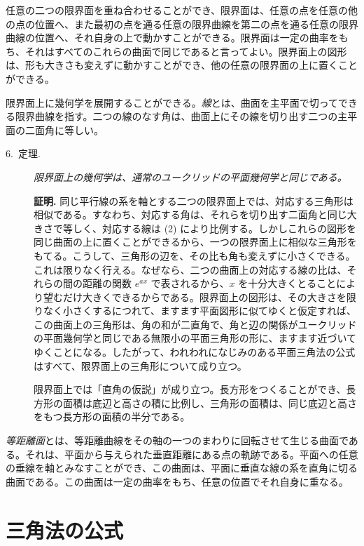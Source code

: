 任意の二つの限界面を重ね合わせることができ、限界面は、任意の点を任意の他の点の位置へ、また最初の点を通る任意の限界曲線を第二の点を通る任意の限界曲線の位置へ、それ自身の上で動かすことができる。限界面は一定の曲率をもち、それはすべてのこれらの曲面で同じであると言ってよい。限界面上の図形は、形も大きさも変えずに動かすことができ、他の任意の限界面の上に置くことができる。

限界面上に幾何学を展開することができる。\emph{線}とは、曲面を主平面で切ってできる限界曲線を指す。二つの線のなす角は、曲面上にその線を切り出す二つの主平面の二面角に等しい。

\begin{description}
\item[6.~定理.] \emph{限界面上の幾何学は、通常のユークリッドの平面幾何学と同じである。}

\textbf{証明.} 同じ平行線の系を軸とする二つの限界面上では、対応する三角形は相似である。すなわち、対応する角は、それらを切り出す二面角と同じ大きさで等しく、対応する線は (2) により比例する。しかしこれらの図形を同じ曲面の上に置くことができるから、一つの限界面上に相似な三角形をもてる。こうして、三角形の辺を、その比も角も変えずに小さくできる。これは限りなく行える。なぜなら、二つの曲面上の対応する線の比は、それらの間の距離の関数 $e^{ax}$ で表されるから、$x$ を十分大きくとることにより望むだけ大きくできるからである。限界面上の図形は、その大きさを限りなく小さくするにつれて、ますます平面図形に似てゆくと仮定すれば、この曲面上の三角形は、角の和が二直角で、角と辺の関係がユークリッドの平面幾何学と同じである無限小の平面三角形の形に、ますます近づいてゆくことになる。したがって、われわれになじみのある平面三角法の公式はすべて、限界面上の三角形について成り立つ。

限界面上では「直角の仮説」が成り立つ。長方形をつくることができ、長方形の面積は底辺と高さの積に比例し、三角形の面積は、同じ底辺と高さをもつ長方形の面積の半分である。
\end{description}

\emph{等距離面}とは、等距離曲線をその軸の一つのまわりに回転させて生じる曲面である。それは、平面から与えられた垂直距離にある点の軌跡である。平面への任意の垂線を軸とみなすことができ、この曲面は、平面に垂直な線の系を直角に切る曲面である。この曲面は一定の曲率をもち、任意の位置でそれ自身に重なる。

\section{三角法の公式}

